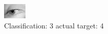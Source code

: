 \begin{figure}[h!]
\begin{center}
\includegraphics[width=0.60\columnwidth]{figures/ID3014_class_3_target_4.png}
\end{center}
\caption{ Classification: 3 actual target: 4}
\label{fig:ID3014_class_3_target_4}
\end{figure}
